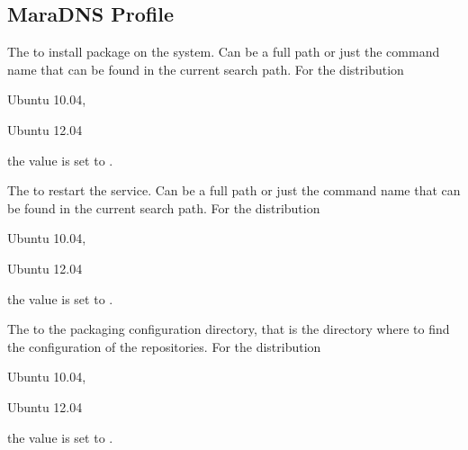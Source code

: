 \label{sec:maradns_profile}
\subsection{MaraDNS Profile}


The  to install package on the system. Can be a full path or
just the command name that can be found in the current search path. 
For the distribution
\begin{inparaitem}
\item[\TheDistribution{ubuntu}] Ubuntu 10.04,
\item[\TheDistribution{ubuntu}] Ubuntu 12.04
\end{inparaitem}
the value is set to .


The  to restart the service. Can be a full path or
just the command name that can be found in the current search path. 
For the distribution
\begin{inparaitem}
\item[\TheDistribution{ubuntu}] Ubuntu 10.04,
\item[\TheDistribution{ubuntu}] Ubuntu 12.04
\end{inparaitem}
the value is set to .


The  to the packaging configuration directory, that is the directory
where to find the configuration of the repositories.
For the distribution
\begin{inparaitem}
\item[\TheDistribution{ubuntu}] Ubuntu 10.04,
\item[\TheDistribution{ubuntu}] Ubuntu 12.04
\end{inparaitem}
the value is set to .

